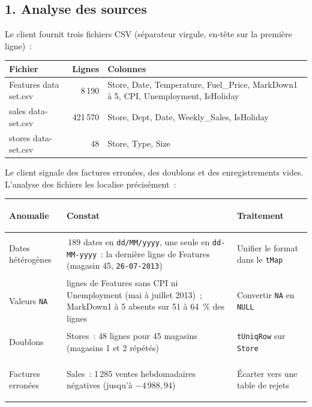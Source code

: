 \subsection*{1. Analyse des sources}
{}

\noindent Le client fournit trois fichiers CSV (séparateur virgule, en-tête sur la première ligne)~:

\begin{center}
\small
\begin{tabularx}{\textwidth}{>{\ttfamily}l r >{\raggedright\arraybackslash}X}
\toprule
\normalfont\textbf{Fichier} & \textbf{Lignes} & \textbf{Colonnes} \\
\midrule
Features data set.csv & 8\,190 & Store, Date, Temperature, Fuel\_Price, MarkDown1 à 5, CPI, Unemployment, IsHoliday \\
sales data-set.csv & 421\,570 & Store, Dept, Date, Weekly\_Sales, IsHoliday \\
stores data-set.csv & 48 & Store, Type, Size \\
\bottomrule
\end{tabularx}
\end{center}

\noindent Le client signale des factures erronées, des doublons et des enregistrements vides. L'analyse des fichiers les localise précisément~:

\begin{center}
\small
\begin{tabularx}{\textwidth}{>{\bfseries\raggedright\arraybackslash}p{2.6cm} >{\raggedright\arraybackslash}X >{\raggedright\arraybackslash}X}
\toprule
Anomalie & Constat & Traitement \\
\midrule
Dates hétérogènes & 8\,189 dates en \texttt{dd/MM/yyyy}, une seule en \texttt{dd-MM-yyyy}~: la dernière ligne de Features (magasin 45, \texttt{26-07-2013}) & Unifier le format dans le \texttt{tMap} \\
Valeurs \texttt{NA} & 585 lignes de Features sans CPI ni Unemployment (mai à juillet 2013)~; MarkDown1 à 5 absents sur 51 à 64~\% des lignes & Convertir \texttt{NA} en \texttt{NULL} \\
Doublons & Stores~: 48 lignes pour 45 magasins (magasins 1 et 2 répétés) & \texttt{tUniqRow} sur \texttt{Store} \\
Factures erronées & Sales~: 1\,285 ventes hebdomadaires négatives (jusqu'à $-4\,988,94$) & Écarter vers une table de rejets \\
\bottomrule
\end{tabularx}
\end{center}

